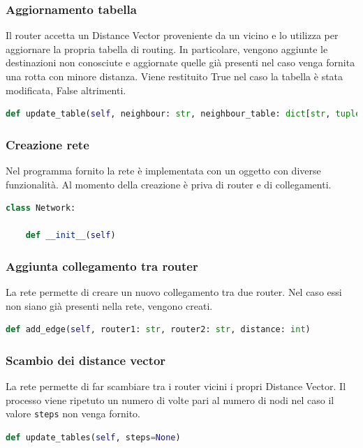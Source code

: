 \documentclass{report}
\begin{document}
\subsubsection{Aggiornamento tabella}
Il router accetta un Distance Vector proveniente da un vicino e lo utilizza per aggiornare la propria tabella di routing. In particolare, vengono aggiunte le destinazioni non conosciute e aggiornate quelle già presenti nel caso venga fornita una rotta con minore distanza. Viene restituito True nel caso la tabella è stata modificata, False altrimenti.
\begin{lstlisting}[language=Python, caption=Aggiornamento tabella]
def update_table(self, neighbour: str, neighbour_table: dict[str, tuple[int, str]])
\end{lstlisting}
\subsubsection{Creazione rete}
Nel programma fornito la rete è implementata con un oggetto  con diverse funzionalità. Al momento della creazione è priva di router e di collegamenti.
\begin{lstlisting}[language=Python, caption=Creazione rete]
class Network:

    def __init__(self)
\end{lstlisting}
\subsubsection{Aggiunta collegamento tra router}
La rete permette di creare un nuovo collegamento tra due router. Nel caso essi non siano già presenti nella rete, vengono creati.
\begin{lstlisting}[language=Python, caption=Aggiunta colegamento tra router]
def add_edge(self, router1: str, router2: str, distance: int)
\end{lstlisting}
\subsubsection{Scambio dei distance vector}
La rete permette di far scambiare tra i router vicini i propri Distance Vector. Il processo viene ripetuto un numero di volte pari al numero di nodi nel caso il valore \verb|steps| non venga fornito.
\begin{lstlisting}[language=Python, caption=Scambio dei Distance Vector]
def update_tables(self, steps=None)
\end{lstlisting}
\end{document}
